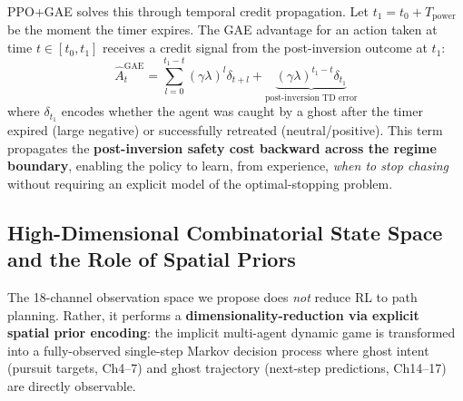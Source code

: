 \documentclass[11pt,a4paper]{article}
\theoremstyle{definition}
\begin{document}
PPO+GAE solves this through temporal credit propagation.
Let $t_1 = t_0 + T_{\text{power}}$ be the moment the timer expires.
The GAE advantage for an action taken at time $t \in [t_0, t_1]$ receives a credit signal from the post-inversion outcome at $t_1$:
\begin{equation}
\hat{A}_t^{\text{GAE}} = \sum_{l=0}^{t_1 - t} (\gamma\lambda)^l \delta_{t+l} + \underbrace{(\gamma\lambda)^{t_1 - t} \delta_{t_1}}_{\text{post-inversion TD error}}
\end{equation}
where $\delta_{t_1}$ encodes whether the agent was caught by a ghost after the timer expired (large negative) or successfully retreated (neutral/positive).
This term propagates the \textbf{post-inversion safety cost backward across the regime boundary}, enabling the policy to learn, from experience, \textit{when to stop chasing} without requiring an explicit model of the optimal-stopping problem.

\subsection{High-Dimensional Combinatorial State Space and the Role of Spatial Priors}

The 18-channel observation space we propose does \textit{not} reduce RL to path planning.
Rather, it performs a \textbf{dimensionality-reduction via explicit spatial prior encoding}: the implicit multi-agent dynamic game is transformed into a fully-observed single-step Markov decision process where ghost intent (pursuit targets, Ch4--7) and ghost trajectory (next-step predictions, Ch14--17) are directly observable.
\end{document}
